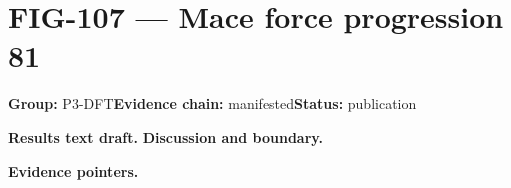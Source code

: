 \clearpage
\section{FIG-107 --- Mace force progression 81}
\label{figpage:fig-107}
\textbf{Group:} P3-DFT\quad \textbf{Evidence chain:} manifested\quad \textbf{Status:} publication

\textbf{Results text draft.} 
\textbf{Discussion and boundary.} 


\textbf{Evidence pointers.}



\vfill
